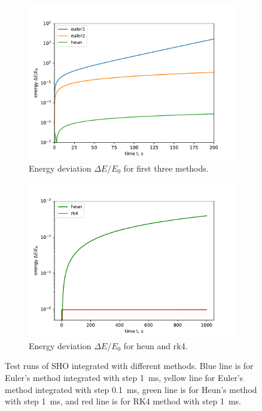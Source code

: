 \documentclass[]{article}
\begin{document}
\begin{figure}[!htb]
		\hfill
		\begin{subfigure}[t]{0.48\textwidth}
			\centering
			\includegraphics[width=\textwidth]{figures/eul12+heun+energy.pdf}
			\caption{Energy deviation $\Delta E/E_0$ for first three methods.\label{subfig:sho-energy1}}
		\end{subfigure}
		\hfill
		\begin{subfigure}[t]{0.48\textwidth}
			\centering
			\includegraphics[width=\textwidth]{figures/heunRK4+energy.pdf}
			\caption{Energy deviation $\Delta E/E_0$ for heun and rk4.\label{subfig:sho-energy2}}
		\end{subfigure}
		\hfill
		\caption{Test runs of SHO integrated with different methods. Blue line is for Euler's method integrated with step \SI{1}{ms}, yellow line for Euler's method integrated with step \SI{0.1}{ms}, green line is for Heun's method with step \SI{1}{ms}, and red line is for RK4 method with step \SI{1}{ms}.\label{fig:sho-integration}}
	\end{figure}
\end{document}
